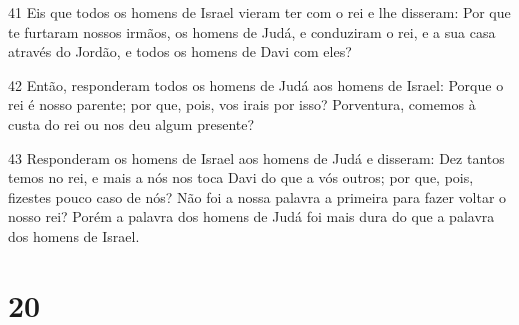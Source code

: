 \par 41 Eis que todos os homens de Israel vieram ter com o rei e lhe disseram: Por que te furtaram nossos irmãos, os homens de Judá, e conduziram o rei, e a sua casa através do Jordão, e todos os homens de Davi com eles?
\par 42 Então, responderam todos os homens de Judá aos homens de Israel: Porque o rei é nosso parente; por que, pois, vos irais por isso? Porventura, comemos à custa do rei ou nos deu algum presente?
\par 43 Responderam os homens de Israel aos homens de Judá e disseram: Dez tantos temos no rei, e mais a nós nos toca Davi do que a vós outros; por que, pois, fizestes pouco caso de nós? Não foi a nossa palavra a primeira para fazer voltar o nosso rei? Porém a palavra dos homens de Judá foi mais dura do que a palavra dos homens de Israel.

\chapter{20}

